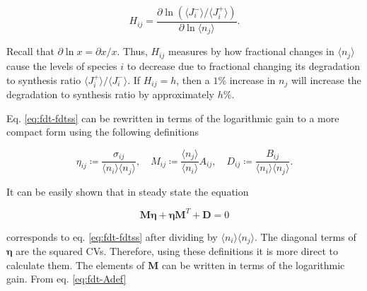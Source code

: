\begin{equation}
  \label{eq:fdt-def_H}
  H_{ij} = \frac{\partial \ln (\langle J_i^-\rangle/\langle J_i^+\rangle)}{\partial \ln \langle n_j\rangle}.
\end{equation}

Recall that $\partial \ln x = \partial x/x$. Thus, $H_{ij}$ measures by how fractional changes in $\langle n_j\rangle$ cause the levels of species $i$ to decrease due to fractional changing its degradation to synthesis ratio $\langle J_i^+\rangle/\langle J_i^-\rangle$. If $H_{ij} = h$, then a $1\%$ increase in $n_j$ will increase the degradation to synthesis ratio by approximately $h\%$.

Eq. \eqref{eq:fdt-fdtss} can be rewritten in terms of the logarithmic gain to a more compact form using the following definitions

\begin{equation*}
  \eta_{ij}\coloneqq\frac{\sigma_{ij}}{\langle n_i\rangle\langle n_j\rangle}, \quad M_{ij}\coloneqq\frac{\langle n_j\rangle}{\langle n_i\rangle}A_{ij}, \quad D_{ij}\coloneqq\frac{B_{ij}}{\langle n_i\rangle\langle n_j\rangle}.
\end{equation*}

It can be easily shown that in steady state the equation

\begin{equation}
  \label{eq:fdt-fdtss2}
  \mathbf{M\eta}+\mathbf{\eta M}^T+\mathbf{D}=0
\end{equation}

corresponds to eq. \eqref{eq:fdt-fdtss} after dividing by $\langle n_i\rangle\langle n_j\rangle$. The diagonal terms of $\mathbf{\eta}$ are the squared CVs. Therefore, using these definitions it is more direct to calculate them. The elements of $\mathbf{M}$ can be written in terms of the logarithmic gain. From eq. \eqref{eq:fdt-Adef}

